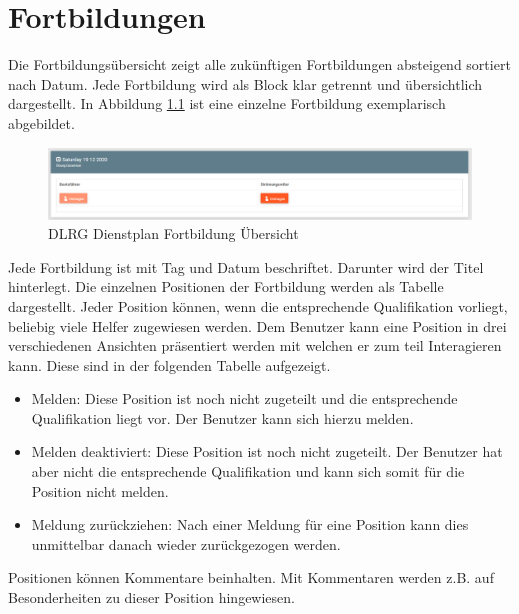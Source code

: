 \chapter{Fortbildungen}
\label{cha:fortbildungen}
Die Fortbildungsübersicht zeigt alle zukünftigen Fortbildungen absteigend sortiert nach Datum. Jede Fortbildung wird als Block klar getrennt und übersichtlich dargestellt. In Abbildung \ref{fig:view_training} \textit{} ist eine einzelne Fortbildung exemplarisch abgebildet.

\begin{figure}[h]
 \begin{addmargin}{-0.2\linewidth}
   \centering 
   \includegraphics[width=20cm]{Bilder/view_training.png}
 \end{addmargin} 
 \caption[Dienste Übersicht]{DLRG Dienstplan Fortbildung Übersicht}
 \label{fig:view_training}
\end{figure}

\noindent Jede Fortbildung ist mit Tag und Datum beschriftet. Darunter wird der Titel hinterlegt. Die einzelnen Positionen der Fortbildung werden als Tabelle dargestellt. Jeder Position können, wenn die entsprechende Qualifikation vorliegt, beliebig viele Helfer zugewiesen werden.
\noindent Dem Benutzer kann eine Position in drei verschiedenen Ansichten präsentiert werden mit welchen er zum teil Interagieren kann.
Diese sind in der folgenden Tabelle aufgezeigt.

\begin{itemize}
\item Melden: Diese Position ist noch nicht zugeteilt und die entsprechende Qualifikation liegt vor. Der Benutzer kann sich hierzu melden.
\item Melden deaktiviert: Diese Position ist noch nicht zugeteilt. Der Benutzer hat aber nicht die entsprechende Qualifikation und kann sich somit für die Position nicht melden.
\item Meldung zurückziehen: Nach einer Meldung für eine Position kann dies unmittelbar danach wieder zurückgezogen werden.
\end{itemize}

\noindent Positionen können Kommentare beinhalten. Mit Kommentaren werden z.B. auf Besonderheiten zu dieser Position hingewiesen.


